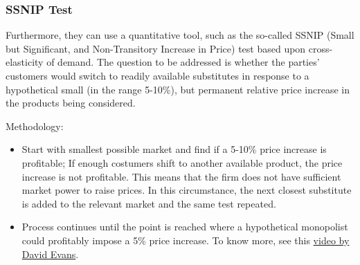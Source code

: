         \subsubsection{SSNIP Test}

            Furthermore, they can use a quantitative tool, such as the so-called SSNIP (Small but Significant, and Non-Transitory Increase in Price) test based upon cross-elasticity of demand.
            The question to be addressed is whether the parties' customers would switch to readily available substitutes in response to a hypothetical small (in the range 5-10\%), but permanent relative price increase in the products being considered.

            Methodology:
            \begin{itemize}
                \item Start with smallest possible market and find if a 5-10\% price increase is profitable; If enough costumers shift to another available product, the price increase is not profitable. This means that the firm does not have sufficient market power to raise prices. In this circumstance, the next closest substitute is added to the relevant market and the same test repeated.
                \item Process continues until the point is reached where a hypothetical monopolist could profitably impose a 5\% price increase. To know more, see this \href{https://www.youtube.com/watch?v=5VE6FaCILaU}{video by David Evans}.
            \end{itemize}


